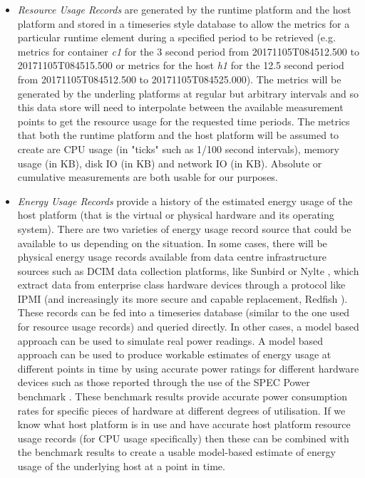 \begin{itemize}
\item \emph{Resource Usage Records} are generated by the runtime platform and the host platform and stored in a timeseries style database to allow the metrics for a particular runtime element during a specified period to be retrieved (e.g. metrics for container \emph{c1} for the 3 second period from 20171105T084512.500 to 20171105T084515.500 or metrics for the host \emph{h1} for the 12.5 second period from 20171105T084512.500 to 20171105T084525.000).  The metrics will be generated by the underling platforms at regular but arbitrary intervals and so this data store will need to interpolate between the available measurement points to get the resource usage for the requested time periods.  The metrics that both the runtime platform and the host platform will be assumed to create are CPU usage (in "ticks" such as 1/100 second intervals), memory usage (in KB), disk IO (in KB) and network IO (in KB).  Absolute or cumulative measurements are both usable for our purposes.

\item \emph{Energy Usage Records} provide a history of the estimated energy usage of the host platform (that is the virtual or physical hardware and its operating system).  There are two varieties of energy usage record source that could be available to us depending on the situation.  In some cases, there will be physical energy usage records available from data centre infrastructure sources such as DCIM data collection platforms, like Sunbird \cite{sunbird2018} or Nylte \cite{nlyte2018}, which extract data from enterprise class hardware devices through a protocol like IPMI \cite{ipmi2013} (and increasingly its more secure and capable replacement, Redfish \cite{dmtf2018-redfish}).  These records can be fed into a timeseries database (similar to the one used for resource usage records) and queried directly.  In other cases, a model based approach can be used to simulate real power readings.  A model based approach can be used to produce workable estimates of energy usage at different points in time by using accurate power ratings for different hardware devices such as those reported through the use of the SPEC Power benchmark \cite{lange2009-specpower}.  These benchmark results provide accurate power consumption rates for specific pieces of hardware at different degrees of utilisation.  If we know what host platform is in use and have accurate host platform resource usage records (for CPU usage specifically) then these can be combined with the benchmark results to create a usable model-based estimate of energy usage of the underlying host at a point in time.

\end{itemize}

